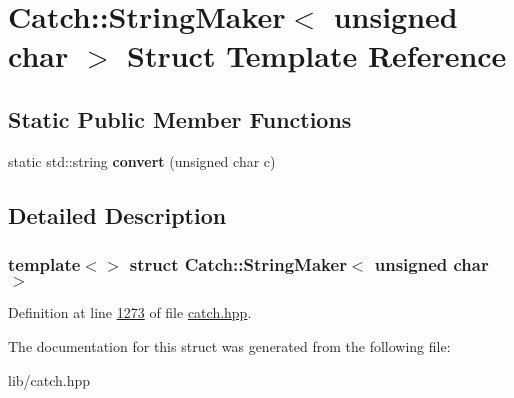 \hypertarget{structCatch_1_1StringMaker_3_01unsigned_01char_01_4}{}\section{Catch\+::String\+Maker$<$ unsigned char $>$ Struct Template Reference}
\label{structCatch_1_1StringMaker_3_01unsigned_01char_01_4}
\subsection*{Static Public Member Functions}
\begin{DoxyCompactItemize}
\item 
\mbox{\label{structCatch_1_1StringMaker_3_01unsigned_01char_01_4_a7cddb1df26275b9a8e631466eb122f59}} 
static std\+::string {\bfseries convert} (unsigned char c)
\end{DoxyCompactItemize}


\subsection{Detailed Description}
\subsubsection*{template$<$$>$\newline
struct Catch\+::\+String\+Maker$<$ unsigned char $>$}



Definition at line \mbox{\hyperlink{catch_8hpp_source_l01273}{1273}} of file \mbox{\hyperlink{catch_8hpp_source}{catch.\+hpp}}.



The documentation for this struct was generated from the following file\+:\begin{DoxyCompactItemize}
\item 
lib/catch.\+hpp\end{DoxyCompactItemize}
